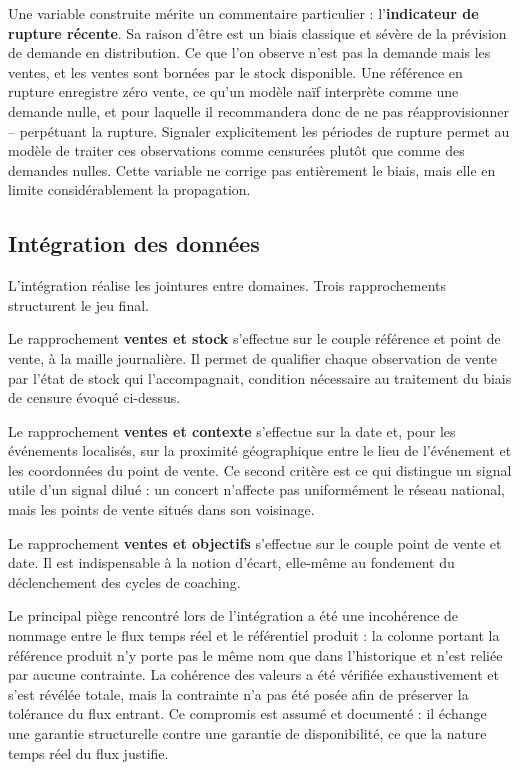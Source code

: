 Une variable construite mérite un commentaire particulier : l'\textbf{indicateur de rupture récente}. Sa raison d'être est un biais classique et sévère de la prévision de demande en distribution. Ce que l'on observe n'est pas la demande mais les ventes, et les ventes sont bornées par le stock disponible. Une référence en rupture enregistre zéro vente, ce qu'un modèle naïf interprète comme une demande nulle, et pour laquelle il recommandera donc de ne pas réapprovisionner -- perpétuant la rupture. Signaler explicitement les périodes de rupture permet au modèle de traiter ces observations comme censurées plutôt que comme des demandes nulles. Cette variable ne corrige pas entièrement le biais, mais elle en limite considérablement la propagation.

\subsection{Intégration des données}

L'intégration réalise les jointures entre domaines. Trois rapprochements structurent le jeu final.

Le rapprochement \textbf{ventes et stock} s'effectue sur le couple référence et point de vente, à la maille journalière. Il permet de qualifier chaque observation de vente par l'état de stock qui l'accompagnait, condition nécessaire au traitement du biais de censure évoqué ci-dessus.

Le rapprochement \textbf{ventes et contexte} s'effectue sur la date et, pour les événements localisés, sur la proximité géographique entre le lieu de l'événement et les coordonnées du point de vente. Ce second critère est ce qui distingue un signal utile d'un signal dilué : un concert n'affecte pas uniformément le réseau national, mais les points de vente situés dans son voisinage.

Le rapprochement \textbf{ventes et objectifs} s'effectue sur le couple point de vente et date. Il est indispensable à la notion d'écart, elle-même au fondement du déclenchement des cycles de coaching.

Le principal piège rencontré lors de l'intégration a été une incohérence de nommage entre le flux temps réel et le référentiel produit : la colonne portant la référence produit n'y porte pas le même nom que dans l'historique et n'est reliée par aucune contrainte. La cohérence des valeurs a été vérifiée exhaustivement et s'est révélée totale, mais la contrainte n'a pas été posée afin de préserver la tolérance du flux entrant. Ce compromis est assumé et documenté : il échange une garantie structurelle contre une garantie de disponibilité, ce que la nature temps réel du flux justifie.

